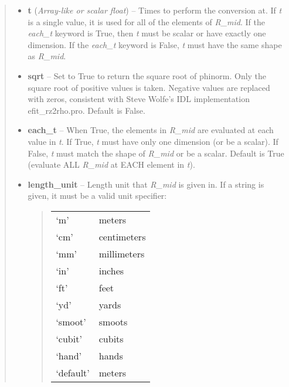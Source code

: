 \documentclass[letterpaper,10pt,english]{sphinxmanual}
\begin{document}
\begin{fulllineitems}
\begin{fulllineitems}
\begin{quote}
\begin{description}
\begin{itemize}
\item {} 
\textbf{t} (\emph{Array-like or scalar float}) -- Times to perform the conversion at.
If \emph{t} is a single value, it is used for all of the elements of
\emph{R\_mid}. If the \emph{each\_t} keyword is True, then \emph{t} must be scalar
or have exactly one dimension. If the \emph{each\_t} keyword is False,
\emph{t} must have the same shape as \emph{R\_mid}.

\item {} 
\textbf{sqrt} -- Set to True to return the square root of phinorm.
Only the square root of positive values is taken. Negative
values are replaced with zeros, consistent with Steve Wolfe's
IDL implementation efit\_rz2rho.pro. Default is False.

\item {} 
\textbf{each\_t} -- When True, the elements in \emph{R\_mid} are evaluated
at each value in \emph{t}. If True, \emph{t} must have only one dimension
(or be a scalar). If False, \emph{t} must match the shape of \emph{R\_mid}
or be a scalar. Default is True (evaluate ALL \emph{R\_mid} at EACH
element in \emph{t}).

\item {} 
\textbf{length\_unit} -- 
Length unit that \emph{R\_mid} is given in.
If a string is given, it must be a valid unit specifier:
\begin{quote}

\begin{tabulary}{\linewidth}{|L|L|}
\hline

`m'
 & 
meters
\\

`cm'
 & 
centimeters
\\

`mm'
 & 
millimeters
\\

`in'
 & 
inches
\\

`ft'
 & 
feet
\\

`yd'
 & 
yards
\\

`smoot'
 & 
smoots
\\

`cubit'
 & 
cubits
\\

`hand'
 & 
hands
\\

`default'
 & 
meters
\\
\hline\end{tabulary}


\end{quote}
\end{itemize}
\end{description}
\end{quote}
\end{fulllineitems}
\end{fulllineitems}
\end{document}

